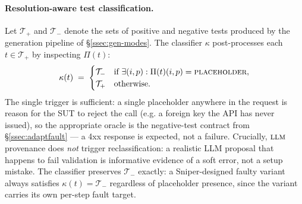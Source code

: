 \documentclass[conference]{IEEEtran}
\begin{document}
\paragraph{Resolution-aware test classification.}
Let $\mathcal{T}_+$ and $\mathcal{T}_-$ denote the sets of positive and negative tests produced by the generation pipeline of \S\ref{ssec:gen-modes}. The classifier $\kappa$ post-processes each $t \in \mathcal{T}_+$ by inspecting $\Pi(t)$:
\[
\kappa(t) \;=\; \begin{cases} \mathcal{T}_- & \text{if } \exists (i, p): \Pi(t)(i, p) = \textsc{placeholder}, \\ \mathcal{T}_+ & \text{otherwise.} \end{cases}
\]
The single trigger is sufficient: a single placeholder anywhere in the request is reason for the SUT to reject the call (e.g. a foreign key the API has never issued), so the appropriate oracle is the negative-test contract from \S\ref{ssec:adaptfault} --- a 4xx response is expected, not a failure. Crucially, $\textsc{llm}$ provenance does \emph{not} trigger reclassification: a realistic LLM proposal that happens to fail validation is informative evidence of a soft error, not a setup mistake. The classifier preserves $\mathcal{T}_-$ exactly: a Sniper-designed faulty variant always satisfies $\kappa(t) = \mathcal{T}_-$ regardless of placeholder presence, since the variant carries its own per-step fault target.
\end{document}
